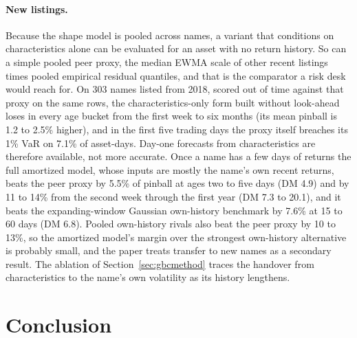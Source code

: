 \documentclass[11pt]{article}
\theoremstyle{remark}
\begin{document}
\paragraph{New listings.} Because the shape model is pooled across names, a variant that conditions on characteristics alone can be evaluated for an asset with no return history. So can a simple pooled peer proxy, the median EWMA scale of other recent listings times pooled empirical residual quantiles, and that is the comparator a risk desk would reach for. On 303 names listed from 2018, scored out of time against that proxy on the same rows, the characteristics-only form built without look-ahead loses in every age bucket from the first week to six months (its mean pinball is 1.2 to 2.5\% higher), and in the first five trading days the proxy itself breaches its 1\% VaR on 7.1\% of asset-days. Day-one forecasts from characteristics are therefore available, not more accurate. Once a name has a few days of returns the full amortized model, whose inputs are mostly the name's own recent returns, beats the peer proxy by 5.5\% of pinball at ages two to five days (DM 4.9) and by 11 to 14\% from the second week through the first year (DM 7.3 to 20.1), and it beats the expanding-window Gaussian own-history benchmark by 7.6\% at 15 to 60 days (DM 6.8). Pooled own-history rivals also beat the peer proxy by 10 to 13\%, so the amortized model's margin over the strongest own-history alternative is probably small, and the paper treats transfer to new names as a secondary result. The ablation of Section~\ref{sec:gbcmethod} traces the handover from characteristics to the name's own volatility as its history lengthens.


\section{Conclusion}\label{sec:limitations}
\end{document}
